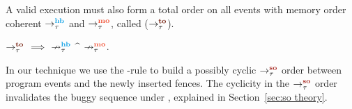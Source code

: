 

A valid \cc execution must also form a total order on all events with memory
order \sc coherent \wrt $\setHB$ and $\setMO$, called  
($\setTO$).
%
\begin{definition}
	$\setTO$ $\implies$ $\nsetHB$ $\^$ $\nsetMO$.
\end{definition}

In our technique we use the \lto-rule to build a possibly cyclic
$\setSO$ order between program events and the newly inserted fences.
The cyclicity in the $\setSO$ order invalidates the buggy sequence
under \cc, explained in Section~\ref{sec:so theory}.